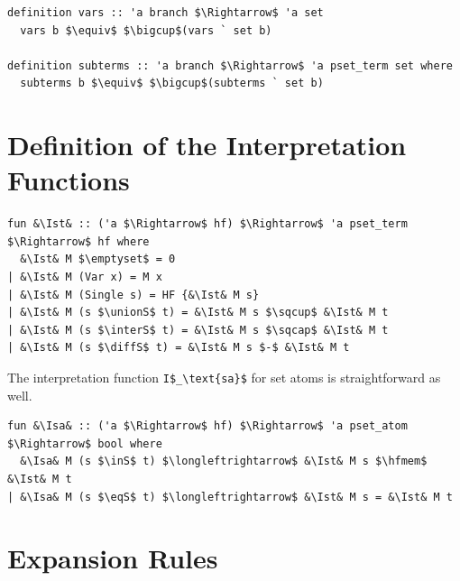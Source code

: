 \documentclass[runningheads]{llncs}
\newcommand{\unionS}{\sqcup_\text{s}}
\newcommand{\interS}{\sqcap_\text{s}}
\newcommand{\diffS}{-_\text{s}}
\newcommand{\inS}{\in_\text{s}}
\newcommand{\eqS}{=_\text{s}}
\newcommand{\Ist}{I$_\text{st}$}
\newcommand{\Isa}{I$_\text{sa}$}
\newcommand{\hfmem}{\boldsymbol{\in}}
\begin{document}
\begin{lstlisting}
definition vars :: 'a branch $\Rightarrow$ 'a set 
  vars b $\equiv$ $\bigcup$(vars ` set b)

definition subterms :: 'a branch $\Rightarrow$ 'a pset_term set where
  subterms b $\equiv$ $\bigcup$(subterms ` set b)
\end{lstlisting}

\section{Definition of the Interpretation Functions}

\begin{lstlisting}
fun &\Ist& :: ('a $\Rightarrow$ hf) $\Rightarrow$ 'a pset_term $\Rightarrow$ hf where
  &\Ist& M $\emptyset$ = 0
| &\Ist& M (Var x) = M x
| &\Ist& M (Single s) = HF {&\Ist& M s}
| &\Ist& M (s $\unionS$ t) = &\Ist& M s $\sqcup$ &\Ist& M t 
| &\Ist& M (s $\interS$ t) = &\Ist& M s $\sqcap$ &\Ist& M t 
| &\Ist& M (s $\diffS$ t) = &\Ist& M s $-$ &\Ist& M t 
\end{lstlisting}
The interpretation function \lstinline!I$_\text{sa}$! for set atoms is straightforward as well.
\begin{lstlisting}
fun &\Isa& :: ('a $\Rightarrow$ hf) $\Rightarrow$ 'a pset_atom $\Rightarrow$ bool where
  &\Isa& M (s $\inS$ t) $\longleftrightarrow$ &\Ist& M s $\hfmem$ &\Ist& M t
| &\Isa& M (s $\eqS$ t) $\longleftrightarrow$ &\Ist& M s = &\Ist& M t
\end{lstlisting}

\section{Expansion Rules}
\end{document}
